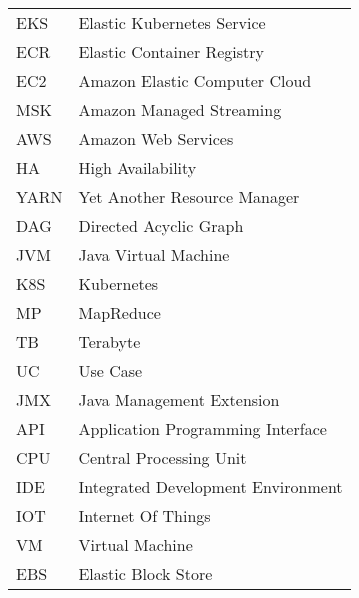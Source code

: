 \begin{longtable}{p{3cm}p{10cm}}
    EKS  & Elastic Kubernetes Service         \\
    ECR  & Elastic Container Registry         \\
    EC2  & Amazon Elastic Computer Cloud      \\
    MSK  & Amazon Managed Streaming           \\
    AWS  & Amazon Web Services                \\
    HA   & High Availability                  \\
    YARN & Yet Another Resource Manager       \\
    DAG  & Directed Acyclic Graph             \\
    JVM  & Java Virtual Machine               \\
    K8S  & Kubernetes                         \\
    MP   & MapReduce                          \\
    TB   & Terabyte                           \\
    UC   & Use Case                           \\
    JMX  & Java Management Extension          \\
    API  & Application Programming Interface  \\
    CPU  & Central Processing Unit            \\
    IDE  & Integrated Development Environment \\
    IOT  & Internet Of Things                 \\
    VM   & Virtual Machine                    \\
    EBS  & Elastic Block Store                \\
\end{longtable}
\addtocounter{table}{-1} 